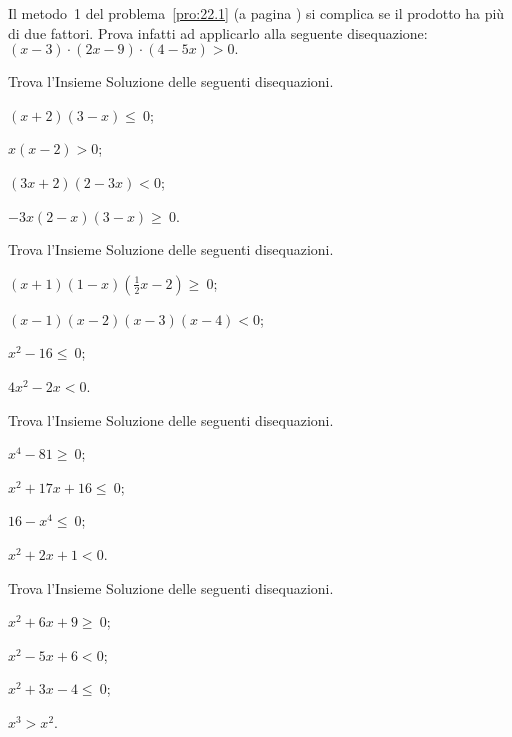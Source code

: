 \begin{esercizio}
 \label{ese:21.43}
 Il metodo~1 del problema~\ref{pro:22.1} (a pagina \pageref{pro:22.1}) si complica se il prodotto ha
più di due fattori. Prova infatti ad applicarlo alla seguente
disequazione:
$(x-3)\cdot (2x-9)\cdot (4-5x)>0.$
\end{esercizio}

\begin{esercizio}[\Ast]
 \label{ese:21.44}
Trova l'Insieme Soluzione delle seguenti disequazioni.
\begin{multicols}{2}
 \begin{enumeratea}
 \item $(x+2)(3-x)\le~0$;
\item $x(x-2)>0$;
\item $(3x+2)(2-3x)<0$;
\item $-3x(2-x)(3-x)\ge~0$.
\end{enumeratea}
\end{multicols}
\end{esercizio}
\begin{esercizio}[\Ast]
 \label{ese:21.45}
Trova l'Insieme Soluzione delle seguenti disequazioni.
\begin{multicols}{2}
 \begin{enumeratea}
 \item $(x+1)(1-x)\left(\frac{1}{2}x-2\right)\ge~0$;
\item $(x-1)(x-2)(x-3)(x-4)<0$;
\item $x^{2}-16\le~0$;
\item $4x^{2}-2x<0$.
\end{enumeratea}
\end{multicols}
\end{esercizio}

\begin{esercizio}[\Ast]
 \label{ese:21.46}
Trova l'Insieme Soluzione delle seguenti disequazioni.
\begin{multicols}{2}
 \begin{enumeratea}
 \item $x^{4}-81\ge~0$;
\item $x^{2}+17x+16\le~0$;
\item $16-x^{4}\le~0$;
\item $x^{2}+2x+1<0$.
\end{enumeratea}
\end{multicols}
\end{esercizio}

\begin{esercizio}[\Ast]
 \label{ese:21.47}
Trova l'Insieme Soluzione delle seguenti disequazioni.
\begin{multicols}{2}
 \begin{enumeratea}
 \item $x^{2}+6x+9\ge~0$;
\item $x^{2}-5x+6<0$;
\item $x^{2}+3x-4\le~0$;
\item $x^{3}>x^{2}$.
\end{enumeratea}
\end{multicols}
\end{esercizio}

